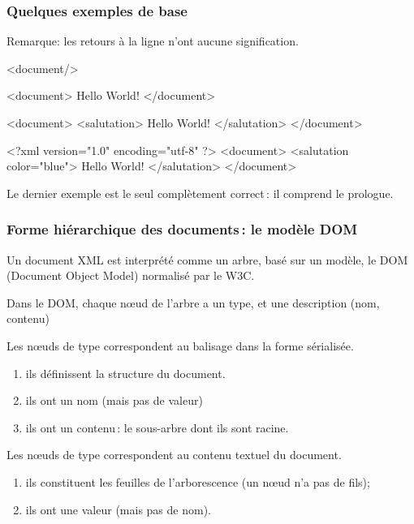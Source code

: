 


\begin{frame}[fragile]
\frametitle{Quelques exemples de base}

Remarque: les retours à la ligne n'ont aucune signification.
\begin{smallverbatim}
  <document/>
  
  <document> Hello World! </document>
  
  <document>
    <salutation> Hello World! </salutation> 
  </document>
  
  <?xml version="1.0" encoding="utf-8" ?> 
  <document>
    <salutation color="blue"> Hello World! </salutation> 
  </document>
\end{smallverbatim}

Le dernier exemple est le seul complètement correct\,: il comprend le prologue.

\end{frame}


\begin{frame}[fragile]
\frametitle{Forme hiérarchique des documents\,: le modèle DOM}

Un document XML est interprété comme un \alert{arbre}, basé sur
 un modèle, le DOM (\alert{Document Object Model}) normalisé par le W3C.

\vfill

Dans le DOM, chaque n{\oe}ud de l'arbre a un \alert{type}, et une \alert{description} (nom, contenu)

\vfill

Les n{\oe}uds de type  correspondent au balisage dans la forme sérialisée.

\begin{enumerate}
  \item ils définissent la \alert{structure} du document.
  \item ils ont un \alert{nom} (mais pas de \alert{valeur})
  \item ils ont un \alert{contenu}\,: le sous-arbre dont ils sont racine.
\end{enumerate}
\vfill
Les n{\oe}uds de type  correspondent au \alert{contenu textuel} du document.

\begin{enumerate}
  \item ils constituent les feuilles de l'arborescence (un n{\oe}ud  n'a pas de fils);
  \item ils ont une \alert{valeur} (mais pas de \alert{nom}).
  \end{enumerate}
\end{frame}

